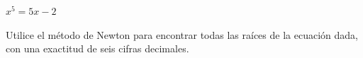 \item $x^5 = 5x - 2$
\par
Utilice el método de Newton para encontrar todas las raíces de la ecuación dada, con una exactitud de seis cifras decimales.

